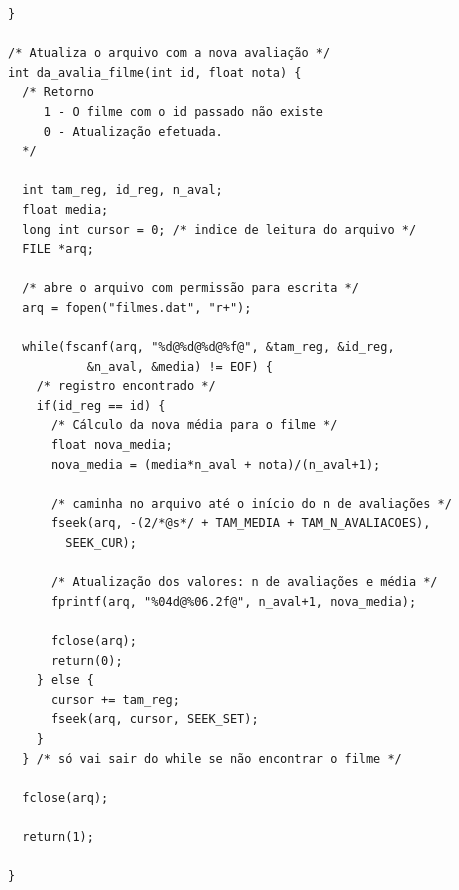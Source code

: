 \documentclass[11pt,twoside]{article}
\begin{document}
\begin{verbatim}
}

/* Atualiza o arquivo com a nova avaliação */
int da_avalia_filme(int id, float nota) {
  /* Retorno
     1 - O filme com o id passado não existe
     0 - Atualização efetuada.
  */

  int tam_reg, id_reg, n_aval;
  float media;
  long int cursor = 0; /* indice de leitura do arquivo */
  FILE *arq;

  /* abre o arquivo com permissão para escrita */
  arq = fopen("filmes.dat", "r+");

  while(fscanf(arq, "%d@%d@%d@%f@", &tam_reg, &id_reg, 
	       &n_aval, &media) != EOF) {
    /* registro encontrado */
    if(id_reg == id) {
      /* Cálculo da nova média para o filme */
      float nova_media;
      nova_media = (media*n_aval + nota)/(n_aval+1);
      
      /* caminha no arquivo até o início do n de avaliações */
      fseek(arq, -(2/*@s*/ + TAM_MEDIA + TAM_N_AVALIACOES), 
	    SEEK_CUR);

      /* Atualização dos valores: n de avaliações e média */
      fprintf(arq, "%04d@%06.2f@", n_aval+1, nova_media);

      fclose(arq);
      return(0);
    } else {
      cursor += tam_reg;
      fseek(arq, cursor, SEEK_SET);
    }
  } /* só vai sair do while se não encontrar o filme */
  
  fclose(arq);
  
  return(1);

}
\end{verbatim}
\end{document}
